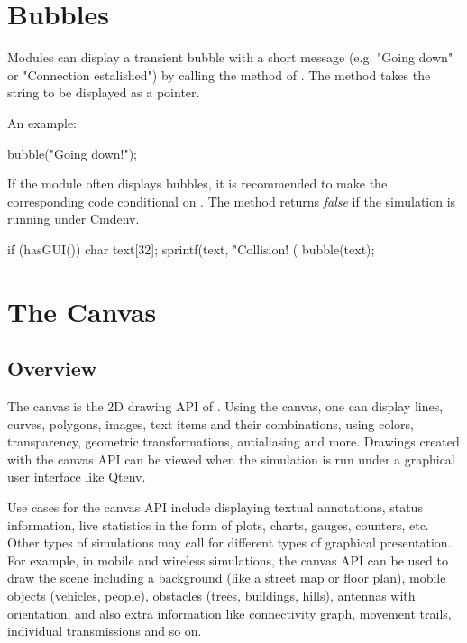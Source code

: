 \section{Bubbles}
\label{sec:graphics:bubbles}

Modules can display a transient bubble with a short message (e.g. "Going
down" or "Connection estalished") by calling the  method of
. The method takes the string to be displayed as a
 pointer.

An example:
\begin{cpp}
bubble("Going down!");
\end{cpp}

\begin{center}
\end{center}

If the module often displays bubbles, it is recommended to make the
corresponding code conditional on . The 
method returns \textit{false} if the simulation is running under Cmdenv.

\begin{cpp}
if (hasGUI()) {
    char text[32];
    sprintf(text, "Collision! (%
    bubble(text);
}
\end{cpp}



\section{The Canvas}
\label{sec:graphics:canvas}

\subsection{Overview}
\label{sec:graphics:canvas-overview}

The canvas is the 2D drawing API of {\opp}. Using the canvas, one can
display lines, curves, polygons, images, text items and their combinations,
using colors, transparency, geometric transformations, antialiasing and
more. Drawings created with the canvas API can be viewed when the simulation
is run under a graphical user interface like Qtenv.

Use cases for the canvas API include displaying textual annotations,
status information, live statistics in the form of plots, charts, gauges,
counters, etc. Other types of simulations may call for different types of
graphical presentation. For example, in mobile and wireless simulations,
the canvas API can be used to draw the scene including a background (like a
street map or floor plan), mobile objects (vehicles, people), obstacles
(trees, buildings, hills), antennas with orientation, and also extra
information like connectivity graph, movement trails, individual
transmissions and so on.

